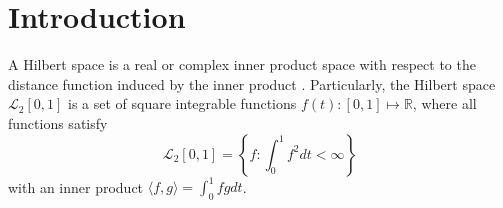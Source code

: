 

\section{Introduction}

%
%
%
%
%
%

A Hilbert space is a real or complex inner product space with respect to the distance function induced by the inner product \cite{dieudonne2013foundations}. Particularly, the Hilbert space $\mathcal{L}_2[0,1]$ is a set of square integrable functions $f(t):[0,1]\mapsto \mathbb{R}$, where all functions satisfy 
\begin{equation*}
\mathcal{L}_2[0,1] =\left\lbrace f:\int_0^1f^2dt <\infty \right\rbrace
\end{equation*}
with an inner product $\langle f,g\rangle=\int_0^1fgdt$. 

